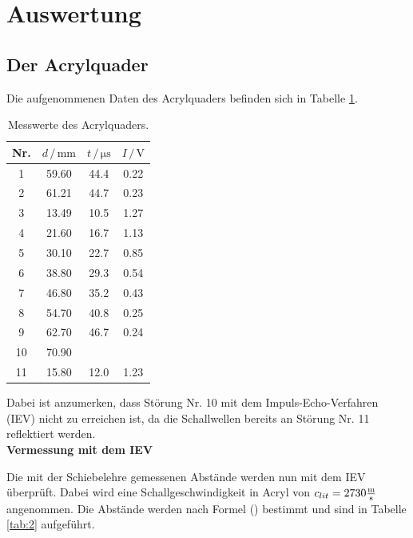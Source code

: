 \newpage
\section{Auswertung}
\subsection{Der Acrylquader}
Die aufgenommenen Daten des Acrylquaders befinden sich in Tabelle \ref{tab:1}.
\begin{table}
    \centering
    \caption{Messwerte des Acrylquaders.}
    \begin{tabular}{c c c c}
        \toprule
        {Nr.} & {$d \, / \, \si{\milli\meter}$} & {$t \, / \, \si{\micro\second} $} & {$I \, / \, \si{\volt}$} \\
        \midrule
     1  & 59.60    &    44.4   &     0.22\\
     2  & 61.21   &    44.7   &     0.23\\
     3  & 13.49   &    10.5   &     1.27\\
     4  & 21.60    &    16.7   &     1.13\\
     5  & 30.10    &    22.7   &     0.85\\
     6  & 38.80    &    29.3   &     0.54\\
     7  & 46.80    &    35.2   &     0.43\\
     8  & 54.70    &    40.8   &     0.25\\
     9  & 62.70    &    46.7   &     0.24\\    
     10 & 70.90    &           &         \\
     11 & 15.80    &    12.0     &     1.23\\
        \bottomrule
    \end{tabular}
    \label{tab:1}
\end{table}

\noindent
Dabei ist anzumerken, dass Störung Nr. 10 mit dem Impuls-Echo-Verfahren (IEV) nicht zu erreichen ist, 
da die Schallwellen bereits an Störung Nr. 11 reflektiert werden. \\

\noindent
\textbf{Vermessung mit dem IEV}

\noindent
Die mit der Schiebelehre gemessenen Abstände werden nun mit dem IEV überprüft.
Dabei wird eine Schallgeschwindigkeit in Acryl von $c_{lit} = 2730 \si[per-mode=fraction]{\meter\per\second}$ angenommen.
Die Abstände werden nach Formel () bestimmt und sind in Tabelle \ref{tab:2} aufgeführt.

